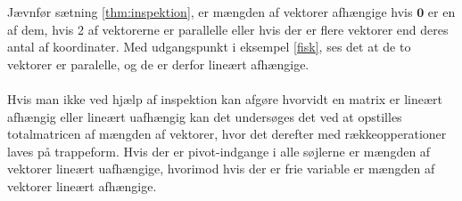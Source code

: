 Jævnfør sætning \ref{thm:inspektion}, er mængden af vektorer afhængige hvis $\mathbf{0}$ er en af dem, hvis 2 af vektorerne er parallelle eller hvis der er flere vektorer end deres antal af koordinater. 
Med udgangspunkt i eksempel \ref{fisk}, ses det at de to vektorer er paralelle, og de er derfor lineært afhængige. 
\\\\
Hvis man ikke ved hjælp af inspektion kan afgøre hvorvidt en matrix er lineært afhængig eller lineært uafhængig kan det undersøges det ved at opstilles totalmatricen af mængden af vektorer, hvor det derefter med rækkeopperationer laves på trappeform. 
Hvis der er pivot-indgange i alle søjlerne er mængden af vektorer lineært uafhængige, hvorimod hvis der er frie variable er mængden af vektorer lineært afhængige.
\\\\
%
